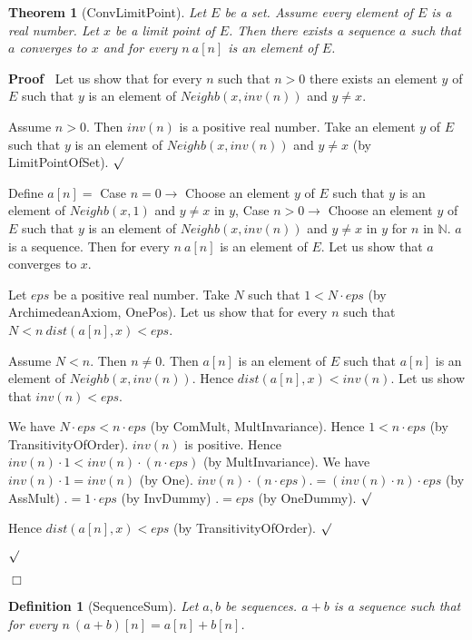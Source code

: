 \documentclass{article}
\newenvironment{forthel}{\begin{leftbar}}{\end{leftbar}}
\newenvironment{proof}{\noindent\textbf{Proof\ }}{\hspace*{\fill}$\Box$\medskip}
\newenvironment{subproof}{\begin{list}{}{}
		\item[\text{Proof}]}{\hfill $\surd$ \end{list}}
\newtheorem{theorem}{Theorem}
\newtheorem{definition}{Definition}
\newcommand{\NN}{\mathbb{N}}
\newcommand{\plusone}{+}
\begin{document}
\begin{forthel}
	\begin{theorem}[ConvLimitPoint]
	Let $E$ be a set. Assume every element of $E$ is a real number. Let $x$ be a limit point of $E$.
	Then there exists a sequence $a$ such that $a$ converges to $x$ and for every $n \ a[n]$ is an element of $E$.
	\end{theorem}
	\begin{proof}
	Let us show that for every $n$ such that $n > 0$ there exists an element $y$ of $E$ such that
	$y$ is an element of $Neighb(x,inv(n))$ and $y \neq x$.
	\begin{subproof}
	Assume $n > 0$.
	Then $inv(n)$ is a positive real number.
	Take an element $y$ of $E$ such that $y$ is an element of $Neighb(x,inv(n))$
	and $y \neq x$ (by LimitPointOfSet).
	\end{subproof}
	Define $a[n] =$ Case $n = 0 \rightarrow$ Choose an element $y$ of $E$ such that $y$ is an element of
	$Neighb(x,1)$ and $y \neq x$ in $y$,
	Case $n > 0 \rightarrow$ Choose an element $y$ of $E$ such that $y$ is an element of
	$Neighb(x,inv(n))$ and $y \neq x$ in $y$
	for $n$ in $\NN$.
	$a$ is a sequence.	
	Then for every $n \ a[n]$ is an element of $E$.
	Let us show that $a$ converges to $x$.
	\begin{subproof}
	Let $eps$ be a positive real number.
	Take $N$ such that $1 < N \cdot eps$ (by ArchimedeanAxiom, OnePos).
	Let us show that for every $n$ such that $N < n \ dist(a[n],x) < eps$.
	\begin{subproof}
	Assume $N < n$. Then $n \neq 0$.
	Then $a[n]$ is an element of $E$ such that $a[n]$ is an element of $Neighb(x,inv(n))$.
	Hence $dist(a[n],x) < inv(n)$.
	Let us show that $inv(n) < eps$.
	\begin{subproof}
	We have $N \cdot eps < n \cdot eps$ (by ComMult, MultInvariance).
	Hence $1 < n \cdot eps$ (by TransitivityOfOrder).
	$inv(n)$ is positive.
	Hence $inv(n) \cdot 1 < inv(n) \cdot (n \cdot eps)$ (by MultInvariance).
	We have $inv(n) \cdot 1 = inv(n)$ (by One).
	$inv(n) \cdot (n \cdot eps) .= (inv(n) \cdot n) \cdot eps$ (by AssMult)
	$.= 1 \cdot eps$ (by InvDummy)
	$.= eps$ (by OneDummy).
	\end{subproof}
	Hence $dist(a[n],x) < eps$ (by TransitivityOfOrder).
	\end{subproof}
	\end{subproof}
	\end{proof}
	
	\begin{definition}[SequenceSum]
	Let $a,b$ be sequences. $a \plusone b$ is a sequence such that for every $n \ (a \plusone b)[n] = a[n] + b[n]$.
	\end{definition}
	

\end{forthel}
\end{document}
